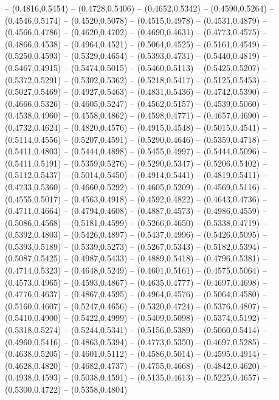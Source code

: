 {	-- (0.4816,0.5454)
	-- (0.4728,0.5406)
	-- (0.4652,0.5342)
	-- (0.4590,0.5264)
	-- (0.4546,0.5174)
	-- (0.4520,0.5078)
	-- (0.4515,0.4978)
	-- (0.4531,0.4879)
	-- (0.4566,0.4786)
	-- (0.4620,0.4702)
	-- (0.4690,0.4631)
	-- (0.4773,0.4575)
	-- (0.4866,0.4538)
	-- (0.4964,0.4521)
	-- (0.5064,0.4525)
	-- (0.5161,0.4549)
	-- (0.5250,0.4593)
	-- (0.5329,0.4654)
	-- (0.5393,0.4731)
	-- (0.5440,0.4819)
	-- (0.5467,0.4915)
	-- (0.5474,0.5015)
	-- (0.5460,0.5113)
	-- (0.5425,0.5207)
	-- (0.5372,0.5291)
	-- (0.5302,0.5362)
	-- (0.5218,0.5417)
	-- (0.5125,0.5453)
	-- (0.5027,0.5469)
	-- (0.4927,0.5463)
	-- (0.4831,0.5436)
	-- (0.4742,0.5390)
	-- (0.4666,0.5326)
	-- (0.4605,0.5247)
	-- (0.4562,0.5157)
	-- (0.4539,0.5060)
	-- (0.4538,0.4960)
	-- (0.4558,0.4862)
	-- (0.4598,0.4771)
	-- (0.4657,0.4690)
	-- (0.4732,0.4624)
	-- (0.4820,0.4576)
	-- (0.4915,0.4548)
	-- (0.5015,0.4541)
	-- (0.5114,0.4556)
	-- (0.5207,0.4591)
	-- (0.5290,0.4646)
	-- (0.5359,0.4718)
	-- (0.5411,0.4803)
	-- (0.5444,0.4898)
	-- (0.5455,0.4997)
	-- (0.5444,0.5096)
	-- (0.5411,0.5191)
	-- (0.5359,0.5276)
	-- (0.5290,0.5347)
	-- (0.5206,0.5402)
	-- (0.5112,0.5437)
	-- (0.5014,0.5450)
	-- (0.4914,0.5441)
	-- (0.4819,0.5411)
	-- (0.4733,0.5360)
	-- (0.4660,0.5292)
	-- (0.4605,0.5209)
	-- (0.4569,0.5116)
	-- (0.4555,0.5017)
	-- (0.4563,0.4918)
	-- (0.4592,0.4822)
	-- (0.4643,0.4736)
	-- (0.4711,0.4664)
	-- (0.4794,0.4608)
	-- (0.4887,0.4573)
	-- (0.4986,0.4559)
	-- (0.5086,0.4568)
	-- (0.5181,0.4599)
	-- (0.5266,0.4650)
	-- (0.5338,0.4719)
	-- (0.5392,0.4803)
	-- (0.5426,0.4897)
	-- (0.5437,0.4996)
	-- (0.5426,0.5095)
	-- (0.5393,0.5189)
	-- (0.5339,0.5273)
	-- (0.5267,0.5343)
	-- (0.5182,0.5394)
	-- (0.5087,0.5425)
	-- (0.4987,0.5433)
	-- (0.4889,0.5418)
	-- (0.4796,0.5381)
	-- (0.4714,0.5323)
	-- (0.4648,0.5249)
	-- (0.4601,0.5161)
	-- (0.4575,0.5064)
	-- (0.4573,0.4965)
	-- (0.4593,0.4867)
	-- (0.4635,0.4777)
	-- (0.4697,0.4698)
	-- (0.4776,0.4637)
	-- (0.4867,0.4595)
	-- (0.4964,0.4576)
	-- (0.5064,0.4580)
	-- (0.5160,0.4607)
	-- (0.5247,0.4656)
	-- (0.5320,0.4724)
	-- (0.5376,0.4807)
	-- (0.5410,0.4900)
	-- (0.5422,0.4999)
	-- (0.5409,0.5098)
	-- (0.5374,0.5192)
	-- (0.5318,0.5274)
	-- (0.5244,0.5341)
	-- (0.5156,0.5389)
	-- (0.5060,0.5414)
	-- (0.4960,0.5416)
	-- (0.4863,0.5394)
	-- (0.4773,0.5350)
	-- (0.4697,0.5285)
	-- (0.4638,0.5205)
	-- (0.4601,0.5112)
	-- (0.4586,0.5014)
	-- (0.4595,0.4914)
	-- (0.4628,0.4820)
	-- (0.4682,0.4737)
	-- (0.4755,0.4668)
	-- (0.4842,0.4620)
	-- (0.4938,0.4593)
	-- (0.5038,0.4591)
	-- (0.5135,0.4613)
	-- (0.5225,0.4657)
	-- (0.5300,0.4722)
	-- (0.5358,0.4804)
}
